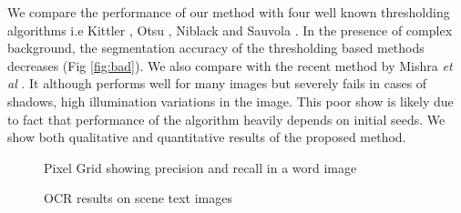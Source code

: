 We compare the performance of our method with four well known thresholding algorithms 
i.e Kittler \cite{A5}, Otsu \cite{A2}, Niblack \cite{A9} and Sauvola \cite{A6}.
In the presence of complex
background, the segmentation accuracy of the thresholding based methods decreases (Fig \ref{fig:bad}).
We also compare with the recent method by Mishra \emph{et al} \cite{A16}.
It although performs well for many images but severely
fails in cases of shadows, high illumination variations 
in the image. This poor show is likely due to fact that
performance of the algorithm heavily depends on initial seeds.
We show both qualitative and quantitative results of the proposed method. 
\begin{figure}[p]
\centering
{}
\label{fig:accuracy}
\caption
{Pixel Grid showing precision and recall in a word image}
\vspace{7mm}
\label{fig:ocr}
\caption
{OCR results on scene text images}
\end{figure}
